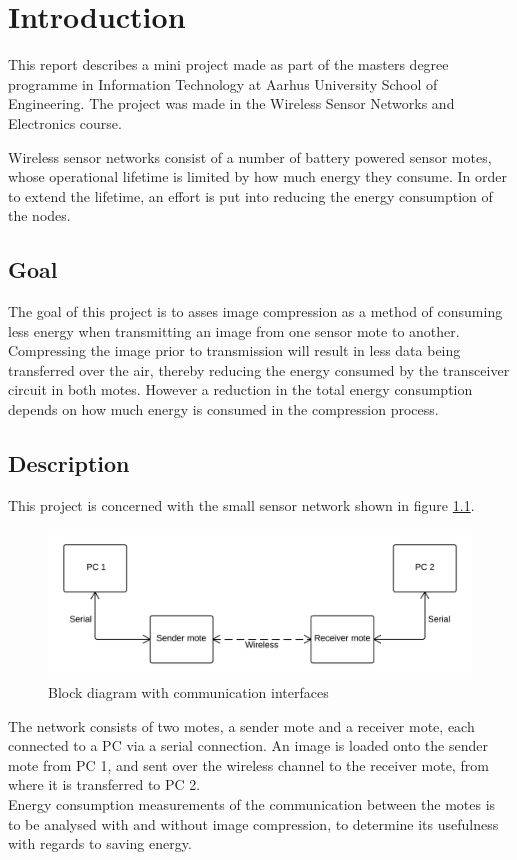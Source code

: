 \chapter{Introduction}
This report describes a mini project made as part of the masters degree programme in Information Technology at Aarhus University School of Engineering. The project was made in the Wireless Sensor Networks and Electronics course.

Wireless sensor networks consist of a number of battery powered sensor motes, whose operational lifetime is limited by how much energy they consume. In order to extend the lifetime, an effort is put into reducing the energy consumption of the nodes.    

\section{Goal}
The goal of this project is to asses image compression as a method of consuming less energy when transmitting an image from one sensor mote to another. Compressing the image prior to transmission will result in less data being transferred over the air, thereby reducing the energy consumed by the transceiver circuit in both motes. However a reduction in the total energy consumption depends on how much energy is consumed in the compression process.

\section{Description} \label{sec:description}
This project is concerned with the small sensor network shown in figure \ref{fig:blockDia}. 

\begin{figure}[H]
	\centering
	\includegraphics[width=\linewidth, scale = 0.7]{Figures/SimpleBlockDiagram}
	\caption{Block diagram with communication interfaces}
    \label{fig:blockDia}
\end{figure}

The network consists of two motes, a sender mote and a receiver mote, each connected to a PC via a serial connection. An image is loaded onto the sender mote from PC 1, and sent over the wireless channel to the receiver mote, from where it is transferred to PC 2. 
\\Energy consumption measurements of the communication between the motes is to be analysed with and without image compression, to determine its usefulness with regards to saving energy.


